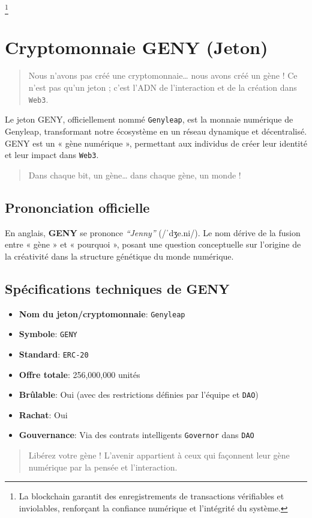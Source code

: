 \documentclass[a4paper,12pt,openany]{book}
\begin{document}
\footnote{La blockchain garantit des enregistrements de transactions vérifiables et inviolables, renforçant la confiance numérique et l'intégrité du système.}

\chapter{Cryptomonnaie GENY (Jeton)}
\begin{quote}
Nous n'avons pas créé une cryptomonnaie… nous avons créé un gène ! Ce n'est pas qu'un jeton ; c'est l'ADN de l'interaction et de la création dans \texttt{Web3}.
\end{quote}
Le jeton GENY, officiellement nommé \texttt{Genyleap}, est la monnaie numérique de Genyleap, transformant notre écosystème en un réseau dynamique et décentralisé. GENY est un « gène numérique », permettant aux individus de créer leur identité et leur impact dans \texttt{Web3}.
\begin{quote}
Dans chaque bit, un gène… dans chaque gène, un monde !
\end{quote}

\section*{Prononciation officielle}
En anglais, \textbf{GENY} se prononce \textit{``Jenny''} ({\ipafont /ˈdʒe.ni/}). Le nom dérive de la fusion entre « gène » et « pourquoi », posant une question conceptuelle sur l'origine de la créativité dans la structure génétique du monde numérique.

\section*{Spécifications techniques de GENY}
\begin{itemize}
    \item \textbf{Nom du jeton/cryptomonnaie}: \texttt{Genyleap}
    \item \textbf{Symbole}: \texttt{GENY}
    \item \textbf{Standard}: \texttt{ERC-20}
    \item \textbf{Offre totale}: 256,000,000 unités
    \item \textbf{Brûlable}: Oui (avec des restrictions définies par l'équipe et \texttt{DAO})
    \item \textbf{Rachat}: Oui
    \item \textbf{Gouvernance}: Via des contrats intelligents \texttt{Governor} dans \texttt{DAO}
\end{itemize}
\vspace{-0.5em}
\begin{quote}
Libérez votre gène ! L'avenir appartient à ceux qui façonnent leur gène numérique par la pensée et l'interaction.
\end{quote}
\newpage
\end{document}
